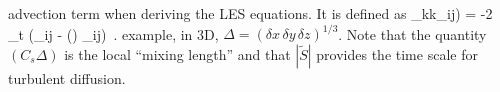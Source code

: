 %
advection term when deriving the LES equations.  It is defined as
_{kk}\delta_{ij}\right) =  -2 \mu_t \left(_{ij} -  (\nabla\!\cdot{})
\delta_{ij}\right) \,\mbox{.}
example, in 3D, $\Delta = (\delta x \,\delta y \,\delta z)^{1/3}$.  Note that the quantity $(C_s \Delta)$ is the local ``mixing
length'' and that $|\tilde{S}|$ provides the time scale for turbulent diffusion.
%
%
%
